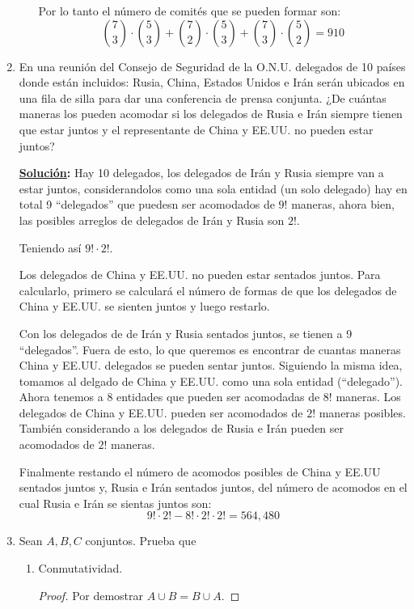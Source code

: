 \documentclass[11pt,letterpaper]{report}
\newcommand{\sol}{\textbf{\underline{Solución}: }} %
\begin{document}
\begin{enumerate}
\begin{enumerate}[label=\alph*)]
    Por lo tanto el número de comités que se pueden formar son:
    $$\binom{7}{3} \cdot \binom{5}{3} + \binom{7}{2} \cdot \binom{5}{3} + \binom{7}{3} \cdot \binom{5}{2} = 910$$
\end{enumerate}

\item En una reunión del Consejo de Seguridad de la O.N.U. delegados de 10 países donde están incluidos:
Rusia, China, Estados Unidos e Irán serán ubicados en una fila de silla para dar una conferencia de
prensa conjunta. ¿De cuántas maneras los pueden acomodar si los delegados de Rusia e Irán siempre
tienen que estar juntos y el representante de China y EE.UU. no pueden estar juntos?

\sol Hay 10 delegados, los delegados de Irán y Rusia siempre van a estar juntos, considerandolos
como una sola entidad (un solo delegado) hay en total 9 ``delegados'' que puedesn ser acomodados de 
$9!$ maneras, ahora bien, las posibles arreglos de delegados de Irán y Rusia son $2!$.

Teniendo así $9! \cdot 2!$.

Los delegados de China y EE.UU. no pueden estar sentados juntos. Para calcularlo, primero se
calculará el número de formas de que los delegados de China y EE.UU. se sienten juntos y luego
restarlo.

Con los delegados de de Irán y Rusia sentados juntos, se tienen a 9 ``delegados''. Fuera de esto,
lo que queremos es encontrar de cuantas maneras China y EE.UU. delegados se pueden sentar juntos.
Siguiendo la misma idea, tomamos al delgado de China y EE.UU. como una sola entidad (``delegado'').
Ahora tenemos a 8 entidades que pueden ser acomodadas de $8!$ maneras. Los delegados de China y
EE.UU. pueden ser acomodados de $2!$ maneras posibles. También considerando a los delegados de
Rusia e Irán pueden ser acomodados de $2!$ maneras.

Finalmente restando el número de acomodos posibles de China y EE.UU sentados juntos y, Rusia e Irán
sentados juntos, del número de acomodos en el cual Rusia e Irán se sientas juntos son:
$$9! \cdot 2! - 8! \cdot 2! \cdot 2! = 564,480$$

\item Sean $A,B,C$ conjuntos. Prueba que
\begin{enumerate}[label=\alph*)]
    \item Conmutatividad.
    \begin{proof}
        Por demostrar $A \cup B = B \cup A$.
        

\end{proof}
\end{enumerate}
\end{enumerate}
\end{document}
